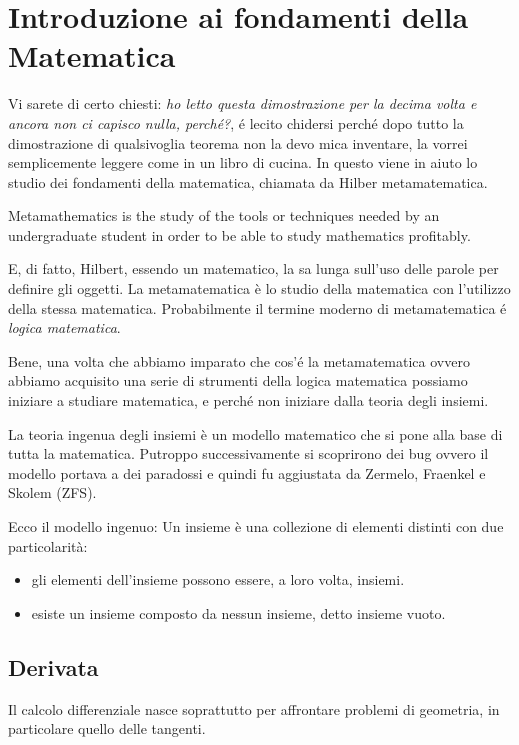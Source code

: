 \chapter{Introduzione ai fondamenti della Matematica}

Vi sarete di certo chiesti: \textit{ho letto questa dimostrazione per la decima volta e ancora non ci capisco nulla, perch\'e?}, \'e lecito chidersi perch\'e dopo tutto la dimostrazione di qualsivoglia teorema non la devo mica inventare, la vorrei
semplicemente leggere come in un libro di cucina. In questo viene in aiuto lo studio dei fondamenti della matematica, chiamata da Hilber metamatematica.
 
Metamathematics is the study of the tools or techniques needed by an undergraduate student in order to be able to study mathematics profitably. 

E, di fatto, Hilbert, essendo un matematico, la sa lunga sull'uso delle parole per definire gli oggetti. La metamatematica è lo studio della matematica con l'utilizzo della stessa matematica. Probabilmente il termine moderno di metamatematica \'e \textit{logica matematica}.

Bene, una volta che abbiamo imparato che cos'\'e la metamatematica ovvero abbiamo acquisito una serie di strumenti della logica matematica possiamo iniziare a studiare matematica, e perch\'e non iniziare dalla teoria degli insiemi.

La teoria ingenua degli insiemi è un modello matematico che si pone alla base di tutta la matematica.  
Putroppo successivamente si scoprirono dei bug ovvero
il modello portava a dei paradossi e quindi fu aggiustata da Zermelo, Fraenkel e Skolem (ZFS). 

Ecco il modello ingenuo:  
Un insieme è una collezione di elementi distinti con due particolarità:  
\begin{itemize}
 \item gli elementi dell'insieme possono essere, a loro volta, insiemi.
 \item esiste un insieme composto da nessun insieme, detto insieme vuoto.
\end{itemize}




\section{Derivata}
Il calcolo differenziale nasce soprattutto per affrontare problemi di geometria, in particolare quello delle tangenti.




